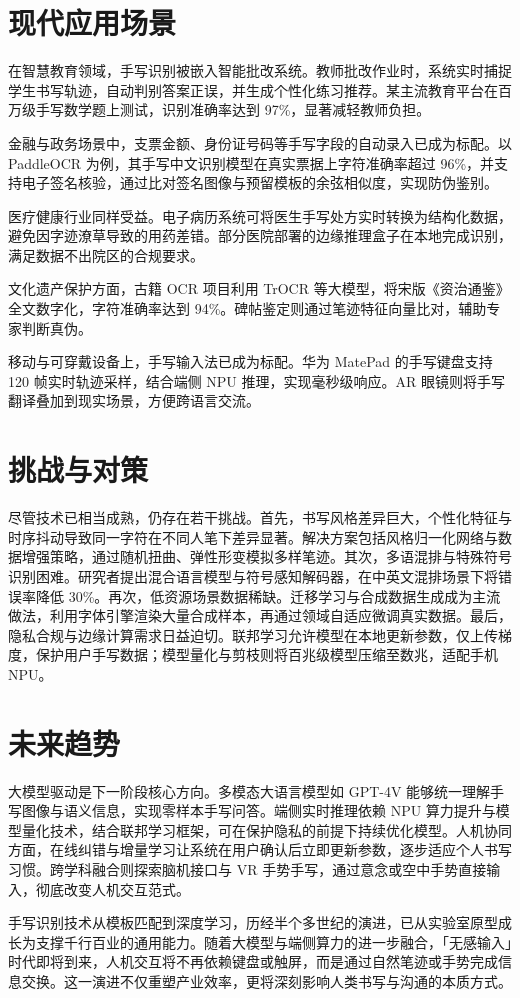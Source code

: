 \chapter{现代应用场景}
在智慧教育领域，手写识别被嵌入智能批改系统。教师批改作业时，系统实时捕捉学生书写轨迹，自动判别答案正误，并生成个性化练习推荐。某主流教育平台在百万级手写数学题上测试，识别准确率达到 97\%{}，显著减轻教师负担。\par
金融与政务场景中，支票金额、身份证号码等手写字段的自动录入已成为标配。以 PaddleOCR 为例，其手写中文识别模型在真实票据上字符准确率超过 96\%{}，并支持电子签名核验，通过比对签名图像与预留模板的余弦相似度，实现防伪鉴别。\par
医疗健康行业同样受益。电子病历系统可将医生手写处方实时转换为结构化数据，避免因字迹潦草导致的用药差错。部分医院部署的边缘推理盒子在本地完成识别，满足数据不出院区的合规要求。\par
文化遗产保护方面，古籍 OCR 项目利用 TrOCR 等大模型，将宋版《资治通鉴》全文数字化，字符准确率达到 94\%{}。碑帖鉴定则通过笔迹特征向量比对，辅助专家判断真伪。\par
移动与可穿戴设备上，手写输入法已成为标配。华为 MatePad 的手写键盘支持 120 帧实时轨迹采样，结合端侧 NPU 推理，实现毫秒级响应。AR 眼镜则将手写翻译叠加到现实场景，方便跨语言交流。\par
\chapter{挑战与对策}
尽管技术已相当成熟，仍存在若干挑战。首先，书写风格差异巨大，个性化特征与时序抖动导致同一字符在不同人笔下差异显著。解决方案包括风格归一化网络与数据增强策略，通过随机扭曲、弹性形变模拟多样笔迹。其次，多语混排与特殊符号识别困难。研究者提出混合语言模型与符号感知解码器，在中英文混排场景下将错误率降低 30\%{}。再次，低资源场景数据稀缺。迁移学习与合成数据生成成为主流做法，利用字体引擎渲染大量合成样本，再通过领域自适应微调真实数据。最后，隐私合规与边缘计算需求日益迫切。联邦学习允许模型在本地更新参数，仅上传梯度，保护用户手写数据；模型量化与剪枝则将百兆级模型压缩至数兆，适配手机 NPU。\par
\chapter{未来趋势}
大模型驱动是下一阶段核心方向。多模态大语言模型如 GPT-4V 能够统一理解手写图像与语义信息，实现零样本手写问答。端侧实时推理依赖 NPU 算力提升与模型量化技术，结合联邦学习框架，可在保护隐私的前提下持续优化模型。人机协同方面，在线纠错与增量学习让系统在用户确认后立即更新参数，逐步适应个人书写习惯。跨学科融合则探索脑机接口与 VR 手势手写，通过意念或空中手势直接输入，彻底改变人机交互范式。\par
手写识别技术从模板匹配到深度学习，历经半个多世纪的演进，已从实验室原型成长为支撑千行百业的通用能力。随着大模型与端侧算力的进一步融合，「无感输入」时代即将到来，人机交互将不再依赖键盘或触屏，而是通过自然笔迹或手势完成信息交换。这一演进不仅重塑产业效率，更将深刻影响人类书写与沟通的本质方式。\par
